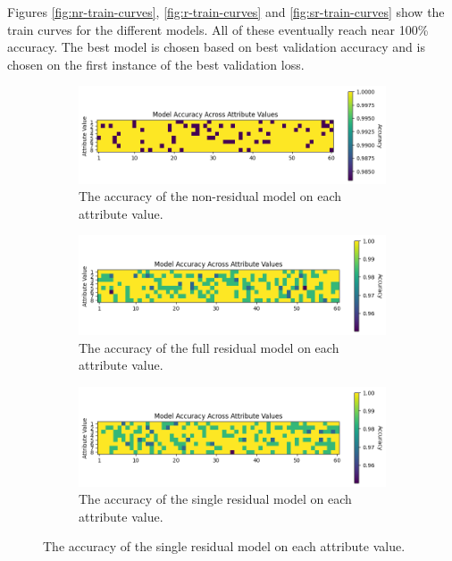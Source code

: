Figures \ref{fig:nr-train-curves}, \ref{fig:r-train-curves} and \ref{fig:sr-train-curves} show the train curves for the different models.
All of these eventually reach near 100\% accuracy.
The best model is chosen based on best validation accuracy and is chosen on the first instance of the best validation loss.

\begin{figure}
    \centering
    \begin{subfigure}{0.9\textwidth}
        \includegraphics[width=\textwidth]{figures/no-residual-accuracy.png}
        \caption{The accuracy of the non-residual model on each attribute value.}
        \label{fig:nr-accuracy}
    \end{subfigure}
    \begin{subfigure}{0.9\textwidth}
        \includegraphics[width=\textwidth]{figures/residual-accuracy.png}
        \caption{The accuracy of the full residual model on each attribute value.}
        \label{fig:r-accuracy}
    \end{subfigure}
    \begin{subfigure}{0.9\textwidth}
        \includegraphics[width=\textwidth]{figures/single-residual-accuracy.png}
        \caption{The accuracy of the single residual model on each attribute value.}
        \label{fig:sr-accuracy}
    \end{subfigure}
\end{figure}

